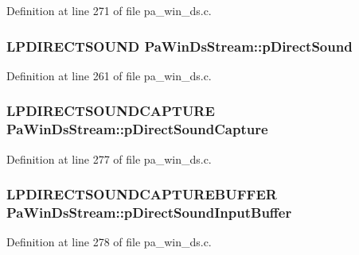 Definition at line 271 of file pa\+\_\+win\+\_\+ds.\+c.

\subsubsection[{\texorpdfstring{p\+Direct\+Sound}{pDirectSound}}]{\setlength{\rightskip}{0pt plus 5cm}L\+P\+D\+I\+R\+E\+C\+T\+S\+O\+U\+ND Pa\+Win\+Ds\+Stream\+::p\+Direct\+Sound}\hypertarget{struct_pa_win_ds_stream_a463a306d8ee5fafbb86d0ffe16574b8c}{}\label{struct_pa_win_ds_stream_a463a306d8ee5fafbb86d0ffe16574b8c}


Definition at line 261 of file pa\+\_\+win\+\_\+ds.\+c.

\subsubsection[{\texorpdfstring{p\+Direct\+Sound\+Capture}{pDirectSoundCapture}}]{\setlength{\rightskip}{0pt plus 5cm}L\+P\+D\+I\+R\+E\+C\+T\+S\+O\+U\+N\+D\+C\+A\+P\+T\+U\+RE Pa\+Win\+Ds\+Stream\+::p\+Direct\+Sound\+Capture}\hypertarget{struct_pa_win_ds_stream_a41406bbfae2cf1c5a4673ecbded9c0ff}{}\label{struct_pa_win_ds_stream_a41406bbfae2cf1c5a4673ecbded9c0ff}


Definition at line 277 of file pa\+\_\+win\+\_\+ds.\+c.

\subsubsection[{\texorpdfstring{p\+Direct\+Sound\+Input\+Buffer}{pDirectSoundInputBuffer}}]{\setlength{\rightskip}{0pt plus 5cm}L\+P\+D\+I\+R\+E\+C\+T\+S\+O\+U\+N\+D\+C\+A\+P\+T\+U\+R\+E\+B\+U\+F\+F\+ER Pa\+Win\+Ds\+Stream\+::p\+Direct\+Sound\+Input\+Buffer}\hypertarget{struct_pa_win_ds_stream_ae18cfa662e81841c320c0ce4a4c3bbca}{}\label{struct_pa_win_ds_stream_ae18cfa662e81841c320c0ce4a4c3bbca}


Definition at line 278 of file pa\+\_\+win\+\_\+ds.\+c.

